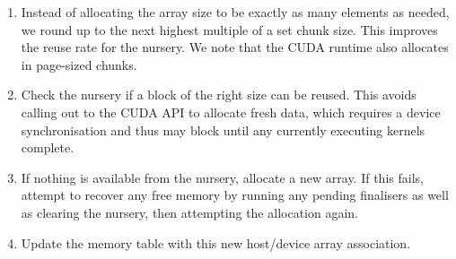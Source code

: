 \begin{enumerate}
\item Instead of allocating the array size to be exactly as many elements as
    needed, we round up to the next highest multiple of a set chunk size. This
    improves the reuse rate for the nursery. We note that the CUDA runtime also
    allocates in page-sized chunks.

\item Check the nursery if a block of the right size can be reused. This avoids
    calling out to the CUDA API to allocate fresh data, which requires a
    device synchronisation and thus may block until any currently executing
    kernels complete.

\item If nothing is available from the nursery, allocate a new array. If this
    fails, attempt to recover any free memory by running any pending finalisers
    as well as clearing the nursery, then attempting the allocation again.

\item Update the memory table with this new host/device array association.

\end{enumerate}

